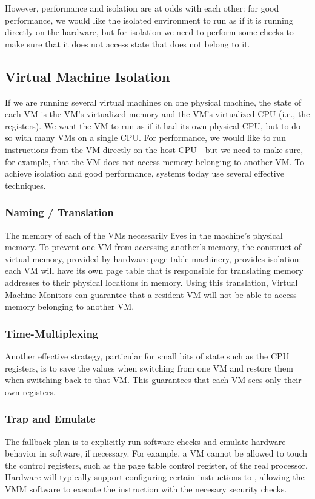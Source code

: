 However, performance and isolation are at odds with each other: for good performance, we would like the isolated environment to run as if it is running directly on the hardware, but for isolation we need to perform some checks to make sure that it does not access state that does not belong to it.

\subsection{Virtual Machine Isolation}
If we are running several virtual machines on one physical machine, the state of each VM is the VM's virtualized memory and the VM's virtualized CPU (i.e., the registers). We want the VM to run as if it had its own physical CPU, but to do so with many VMs on a single CPU. For performance, we would like to run instructions from the VM directly on the host CPU---but we need to make sure, for example, that the VM does not access memory belonging to another VM. To achieve isolation and good performance, systems today use several effective techniques.

\subsubsection{Naming / Translation}
The memory of each of the VMs necessarily lives in the machine's physical memory. To prevent one VM from accessing another's memory, the construct of virtual memory, provided by hardware page table machinery, provides isolation: each VM will have its own page table that is responsible for translating memory addresses to their physical locations in memory. Using this translation, Virtual Machine Monitors can guarantee that a resident VM will not be able to access memory belonging to another VM.

\subsubsection{Time-Multiplexing}
Another effective strategy, particular for small bits of state such as the CPU registers, is to save the values when switching from one VM and restore them when switching back to that VM. This guarantees that each VM sees only their own registers.

\subsubsection{Trap and Emulate}
The fallback plan is to explicitly run software checks and emulate hardware behavior in software, if necessary. For example, a VM cannot be allowed to touch the control registers, such as the page table control register, of the real processor. Hardware will typically support configuring certain instructions to , allowing the VMM software to execute the instruction with the necesary security checks.

